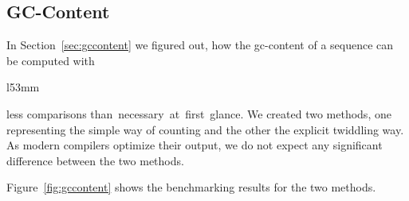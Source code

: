 \documentclass[10pt,letterpaper]{article}
\begin{document}
\subsection{GC-Content}
{
In Section~\ref{sec:gccontent} we figured out, how the gc-content of a sequence can be computed with


\begin{wrapfigure}[11]{l}{53mm}
    \captionsetup{labelformat=empty} %
    \caption{}
    \label{fig:gccontent}
\end{wrapfigure}

\noindent less comparisons than~necessary~at~first~glance. We created two methods, one representing the simple way of counting and the other the explicit twiddling way. As modern compilers optimize their output, we do not expect any significant difference between the two methods.

Figure~\ref{fig:gccontent} shows the benchmarking results for the two methods. %

}
\end{document}

